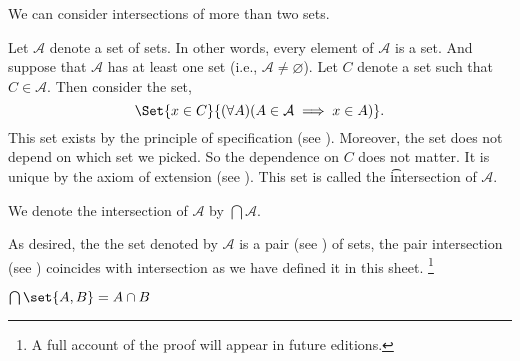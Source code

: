 

We can consider intersections of more than two sets.


Let $\mathcal{A} $ denote a set of sets.
In other words, every element of $\mathcal{A} $ is a set.
And suppose that $\mathcal{A} $ has at least one set (i.e., $\mathcal{A}  \neq \varnothing$).
Let $C$ denote a set such that $C \in \mathcal{A} $.
Then consider the set,
  \[
\Set{x \in C}{(\forall A)(A \in \mathcal{A}  \implies x \in A)}.
  \]
This set exists by the principle of specification (see ).
Moreover, the set does not depend on which set we picked.
So the dependence on $C$ does not matter.
It is unique by the axiom of extension (see ).
This set is called the \t{intersection} of $\mathcal{A} $.


We denote the intersection of $\mathcal{A} $ by $\bigcap \mathcal{A} $.


As desired, the the set denoted by $\mathcal{A} $ is a pair (see ) of sets, the pair intersection (see ) coincides with intersection as we have defined it in this sheet.
  \ifhmode\unskip\fi\footnote{
A full account of the proof will appear in future editions.
  }

\begin{proposition}
$\bigcap \set{A, B} = A \cap B$
\end{proposition}

\blankpage
